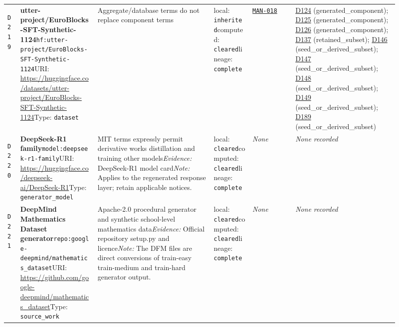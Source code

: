 \documentclass[9pt,a4paper]{article}
\newcommand{\depid}[1]{\hypertarget{dep:#1}{\texttt{#1}}}
\begin{document}
\begin{landscape}
\begin{longtable}{@{}L{0.035\linewidth}L{0.185\linewidth}L{0.27\linewidth}L{0.09\linewidth}L{0.10\linewidth}L{0.24\linewidth}@{}}
\depid{D219} & \textbf{utter-project/EuroBlocks-SFT-Synthetic-1124}\newline \nolinkurl{hf:utter-project/EuroBlocks-SFT-Synthetic-1124}\newline URI: \url{https://huggingface.co/datasets/utter-project/EuroBlocks-SFT-Synthetic-1124}\newline Type: \texttt{dataset} & Aggregate/database terms do not replace component terms & local: \texttt{inherited}\newline computed: \texttt{cleared}\newline lineage: \texttt{complete} & \hyperlink{manual:MAN-018}{\texttt{MAN-018}} & \hyperlink{dep:D124}{D124} (generated\_component); \hyperlink{dep:D125}{D125} (generated\_component); \hyperlink{dep:D126}{D126} (generated\_component); \hyperlink{dep:D137}{D137} (retained\_subset); \hyperlink{dep:D146}{D146} (seed\_or\_derived\_subset); \hyperlink{dep:D147}{D147} (seed\_or\_derived\_subset); \hyperlink{dep:D148}{D148} (seed\_or\_derived\_subset); \hyperlink{dep:D149}{D149} (seed\_or\_derived\_subset); \hyperlink{dep:D189}{D189} (seed\_or\_derived\_subset) \\
\depid{D220} & \textbf{DeepSeek-R1 family}\newline \nolinkurl{model:deepseek-r1-family}\newline URI: \url{https://huggingface.co/deepseek-ai/DeepSeek-R1}\newline Type: \texttt{generator\_model} & MIT terms expressly permit derivative works distillation and training other models\newline \textit{Evidence:} DeepSeek-R1 model card\newline \textit{Note:} Applies to the regenerated response layer; retain applicable notices. & local: \texttt{cleared}\newline computed: \texttt{cleared}\newline lineage: \texttt{complete} & \textit{None} & \textit{None recorded} \\
\depid{D221} & \textbf{DeepMind Mathematics Dataset generator}\newline \nolinkurl{repo:google-deepmind/mathematics_dataset}\newline URI: \url{https://github.com/google-deepmind/mathematics_dataset}\newline Type: \texttt{source\_work} & Apache-2.0 procedural generator and synthetic school-level mathematics data\newline \textit{Evidence:} Official repository setup.py and licence\newline \textit{Note:} The DFM files are direct conversions of train-easy train-medium and train-hard generator output. & local: \texttt{cleared}\newline computed: \texttt{cleared}\newline lineage: \texttt{complete} & \textit{None} & \textit{None recorded} \\

\end{longtable}
\end{landscape}
\end{document}
